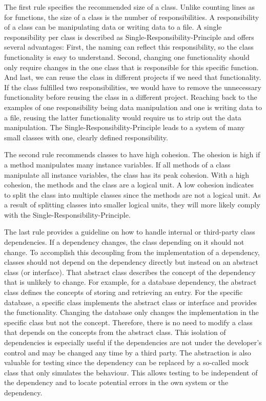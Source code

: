 The first rule specifies the recommended size of a class. Unlike counting lines as for functions, the size of a class is the number of responsibilities. A responsibility of a class can be manipulating data or writing data to a file. A single responsibility per class is described as Single-Responsibility-Principle and offers several advantages: First, the naming can reflect this responsibility, so the class functionality is easy to understand.
Second, changing one functionality should only require changes in the one class that is responsible for this specific function. And last, we can reuse the class in different projects if we need that functionality. If the class fulfilled two responsibilities, we would have to remove the unnecessary functionality before reusing the class in a different project. Reaching back to the examples of one responsibility being data manipulation and one is writing data to a file, reusing the latter functionality would require us to strip out the data manipulation.
The Single-Responsibility-Principle leads to a system of many small classes with one, clearly defined responsibility.

The second rule recommends classes to have high cohesion. The ohesion is high if a method manipulates many instance variables. If all methods of a class manipulate all instance variables, the class has its peak cohesion. With a high cohesion, the methods and the class are a logical unit. A low cohesion indicates to split the class into multiple classes since the methods are not a logical unit. As a result of splitting classes into smaller logical units, they will more likely comply with the Single-Responsibility-Principle.

The last rule provides a guideline on how to handle internal or third-party class dependencies. If a dependency changes, the class depending on it should not change. To accomplish this decoupling from the implementation of a dependency, classes should not depend on the dependency directly but instead on an abstract class (or interface). That abstract class describes the concept of the dependency that is unlikely to change. For example, for a database dependency, the abstract class defines the concepts of storing and retrieving an entry. For the specific database, a specific class implements the abstract class or interface and provides the functionality. Changing the database only changes the implementation in the specific class but not the concept. Therefore, there is no need to modify a class that depends on the concepts from the abstract class. This isolation of dependencies is especially useful if the dependencies are not under the developer's control and may be changed any time by a third party. The abstraction is also valuable for testing since the dependency can be replaced by a so-called mock class that only simulates the behaviour. This allows testing to be independent of the dependency and to locate potential errors in the own system or the dependency.

